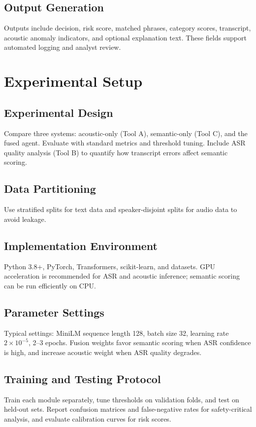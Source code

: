 \documentclass[11pt,a4paper]{article}
\begin{document}
\subsection{Output Generation}
Outputs include decision, risk score, matched phrases, category scores, transcript, acoustic anomaly indicators, and optional explanation text. These fields support automated logging and analyst review.

\section{Experimental Setup}
\subsection{Experimental Design}
Compare three systems: acoustic-only (Tool A), semantic-only (Tool C), and the fused agent. Evaluate with standard metrics and threshold tuning. Include ASR quality analysis (Tool B) to quantify how transcript errors affect semantic scoring.

\subsection{Data Partitioning}
Use stratified splits for text data and speaker-disjoint splits for audio data to avoid leakage.

\subsection{Implementation Environment}
Python 3.8+, PyTorch, Transformers, scikit-learn, and datasets. GPU acceleration is recommended for ASR and acoustic inference; semantic scoring can be run efficiently on CPU.

\subsection{Parameter Settings}
Typical settings: MiniLM sequence length 128, batch size 32, learning rate $2\times10^{-5}$, 2--3 epochs. Fusion weights favor semantic scoring when ASR confidence is high, and increase acoustic weight when ASR quality degrades.

\subsection{Training and Testing Protocol}
Train each module separately, tune thresholds on validation folds, and test on held-out sets. Report confusion matrices and false-negative rates for safety-critical analysis, and evaluate calibration curves for risk scores.
\end{document}
